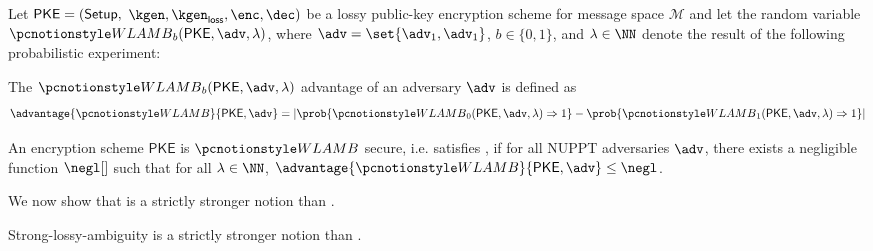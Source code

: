 \begin{definition}
	Let $\mathsf{PKE} = (\mathsf{Setup},$ $\kgen, \kgenlossy, \enc,\allowbreak \dec)$ be a lossy public-key encryption scheme for message space $\mathcal{M}$ and let the random variable $\wlambgame_b(\mathsf{PKE}, \adv, \lambda)$, where $\adv = \set{\adv_1, \adv_1}$, $b \in\{0,1\}$, and $\secpar \in \NN$ denote the result of the following probabilistic experiment:


	The $\wlambgame_b(\mathsf{PKE}, \adv, \lambda)$ advantage of an adversary $\adv$ is defined as
	$$
		\advantage{\wlambgame}{\pke, \adv} =
		\left|
		\prob{\wlambgame_0(\pke, \adv, \secpar) \Rightarrow 1} -
		\prob{\wlambgame_1(\pke, \adv, \secpar) \Rightarrow 1}
		\right|
	$$

	An encryption scheme $\mathsf{PKE}$ is $\wlambgame$ secure, i.e. satisfies \wla{}, if for all NUPPT adversaries $\adv$, there exists a negligible function $\negl[]$ such that for all $\secpar \in \NN$, $\advantage{\wlambgame}{\pke, \adv} \leq \negl$.
\end{definition}

We now show that \sla{} is a strictly stronger notion than \wla{}.

\begin{theorem}
	Strong-lossy-ambiguity is a strictly stronger notion than \wla{}.
\end{theorem}

